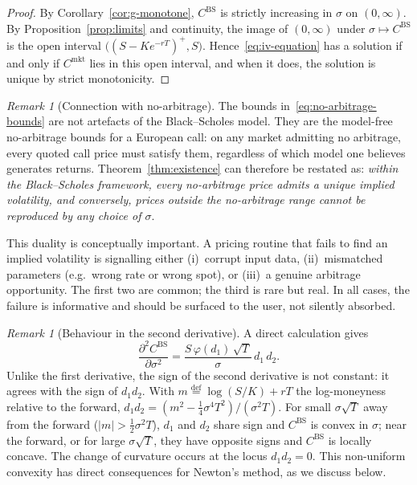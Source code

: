 \documentclass[11pt,a4paper]{article}
\theoremstyle{plain}
\theoremstyle{definition}
\theoremstyle{remark}
\newtheorem{remark}[theorem]{Remark}
\newcommand{\eqdef}{\overset{\mathrm{def}}{=}}
\newcommand{\BS}{\mathrm{BS}}
\begin{document}
\begin{proof}
By Corollary~\ref{cor:g-monotone}, \(C^{\BS}\) is strictly increasing
in \(\sigma\) on \((0, \infty)\). By Proposition~\ref{prop:limits} and
continuity, the image of \((0, \infty)\) under
\(\sigma \mapsto C^{\BS}\) is the open interval
\(\bigl((S - Ke^{-rT})^+, S\bigr)\). Hence~\eqref{eq:iv-equation} has a
solution if and only if \(C^{\mathrm{mkt}}\) lies in this open
interval, and when it does, the solution is unique by strict
monotonicity.
\end{proof}

\begin{remark}[Connection with no-arbitrage]
\label{rem:no-arbitrage}
The bounds in~\eqref{eq:no-arbitrage-bounds} are not artefacts of the
Black--Scholes model. They are the model-free no-arbitrage bounds for
a European call: on any market admitting no arbitrage, every quoted
call price must satisfy them, regardless of which model one believes
generates returns. Theorem~\ref{thm:existence} can therefore be
restated as: \emph{within the Black--Scholes framework, every
no-arbitrage price admits a unique implied volatility, and conversely,
prices outside the no-arbitrage range cannot be reproduced by any
choice of \(\sigma\)}.

This duality is conceptually important. A pricing routine that fails
to find an implied volatility is signalling either (i)~corrupt input
data, (ii)~mismatched parameters (e.g.\ wrong rate or wrong spot), or
(iii)~a genuine arbitrage opportunity. The first two are common; the
third is rare but real. In all cases, the failure is informative and
should be surfaced to the user, not silently absorbed.
\end{remark}

\begin{remark}[Behaviour in the second derivative]
\label{rem:convexity}
A direct calculation gives
\[
    \frac{\partial^2 C^{\BS}}{\partial \sigma^2}
    = \frac{S\,\varphi(d_1)\,\sqrt{T}}{\sigma}\, d_1\, d_2.
\]
Unlike the first derivative, the sign of the second derivative is not
constant: it agrees with the sign of \(d_1 d_2\). With
\(m \eqdef \log(S/K) + rT\) the log-moneyness relative to the forward,
\(d_1 d_2 = (m^2 - \tfrac{1}{4}\sigma^4 T^2)/(\sigma^2 T)\). For small
\(\sigma\sqrt{T}\) away from the forward (\(|m| > \tfrac{1}{2}\sigma^2 T\)),
\(d_1\) and \(d_2\) share sign and \(C^{\BS}\) is convex in \(\sigma\);
near the forward, or for large \(\sigma\sqrt{T}\), they have opposite
signs and \(C^{\BS}\) is locally concave. The change of curvature occurs
at the locus \(d_1 d_2 = 0\). This non-uniform convexity has direct
consequences for Newton's method, as we discuss below.
\end{remark}
\end{document}
